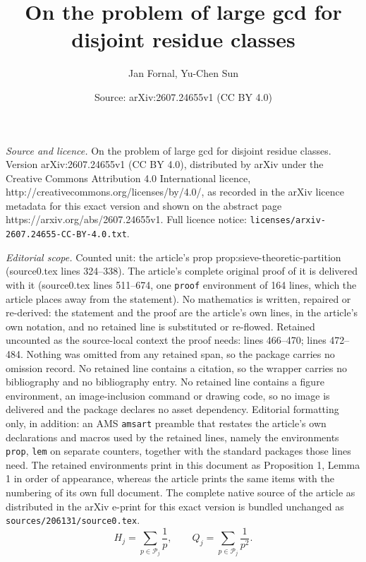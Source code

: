 \documentclass[10pt,a4paper]{amsart}
\title{On the problem of large gcd for disjoint residue classes}
\author{Jan Fornal, Yu-Chen Sun}
\date{Source: arXiv:2607.24655v1 (CC BY 4.0)}
\begin{document}
\maketitle

\noindent\emph{Source and licence.} On the problem of large gcd for disjoint residue classes. Version arXiv:2607.24655v1 (CC BY 4.0), distributed by arXiv under the Creative Commons Attribution 4.0 International licence, http://creativecommons.org/licenses/by/4.0/, as recorded in the arXiv licence metadata for this exact version and shown on the abstract page https://arxiv.org/abs/2607.24655v1. Full licence notice: \texttt{licenses/arxiv-2607.24655-CC-BY-4.0.txt}.\par\smallskip

\noindent\textit{Editorial scope.} Counted unit: the article's prop prop:sieve-theoretic-partition (source0.tex lines 324--338). The article's complete original proof of it is delivered with it (source0.tex lines 511--674, one \texttt{proof} environment of 164 lines, which the article places away from the statement). No mathematics is written, repaired or re-derived: the statement and the proof are the article's own lines, in the article's own notation, and no retained line is substituted or re-flowed.  Retained uncounted as the source-local context the proof needs: lines 466--470; lines 472--484.  Nothing was omitted from any retained span, so the package carries no omission record.  No retained line contains a citation, so the wrapper carries no bibliography and no bibliography entry.  No retained line contains a figure environment, an image-inclusion command or drawing code, so no image is delivered and the package declares no asset dependency.  Editorial formatting only, in addition: an AMS \texttt{amsart} preamble that restates the article's own declarations and macros used by the retained lines, namely the environments \texttt{prop}, \texttt{lem} on separate counters, together with the standard packages those lines need.  The retained environments print in this document as Proposition 1, Lemma 1 in order of appearance, whereas the article prints the same items with the numbering of its own full document.  The complete native source of the article as distributed in the arXiv e-print for this exact version is bundled unchanged as \texttt{sources/206131/source0.tex}.
\begin{equation}\label{eq:HjQj}
 H_j=\sum_{p\in\mathcal P_j}\frac1p,
 \qquad
 Q_j=\sum_{p\in\mathcal P_j}\frac1{p^2}.
\end{equation}
\end{document}
